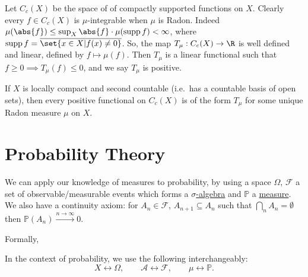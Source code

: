\documentclass{article}
\newcommand{\1}[1]{\mathbbm{1}_{#1}}
\newcommand{\Prob}{\mathbb{P}}
\DeclareMathOperator{\supp}{supp}
\begin{document}
Let $C_c(X)$ be the space of of compactly supported functions on $X$.
Clearly every $f \in C_c(X)$ is $\mu$-integrable when $\mu$ is Radon.
Indeed $\mu(\abs{f}) \leq \sup_X \abs{f} \cdot \mu(\supp f) < \infty$, where $\supp f = \overline{\set{x \in X | f(x) \neq 0}}$.
So, the map $T_\mu: C_c(X) \to \R$ is well defined and linear, defined by $f \mapsto \mu(f)$.
Then $T_\mu$ is a linear functional such that $f \geq 0 \implies T_\mu(f) \leq 0$, and we say $T_\mu$ is positive.

\begin{thm}
    If $X$ is locally compact and second countable (i.e.\ has a countable basis of open sets), then every positive functional on $C_c(X)$ is of the form $T_\mu$ for some unique Radon measure $\mu$ on $X$.
\end{thm}

\section{Probability Theory}
We can apply our knowledge of measures to probability, by using a space $\Omega$, $\mathcal{F}$ a set of observable/measurable events which forms a \hyperlink{def:sigAlg}{$\sigma$-algebra} and $\mathbb{P}$ a \hyperlink{def:measure}{measure}.
We also have a continuity axiom: for $A_n \in \mathcal{F}$, $A_{n+1} \subseteq A_n$ such that $\bigcap_n A_n = \emptyset$ then $\Prob(A_n) \xrightarrow{n \to \infty} 0$.

Formally,



\begin{notation}
    In the context of probability, we use the following interchangeably:
    \begin{equation*}
        X \longleftrightarrow \Omega, \qquad \mathcal{A} \longleftrightarrow \mathcal{F}, \qquad \mu \longleftrightarrow \Prob.
    \end{equation*}
\end{notation}
\end{document}
